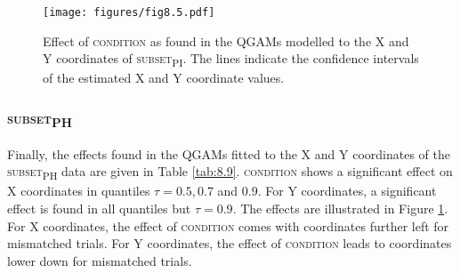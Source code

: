 \begin{figure}[p]
    \centering
    \texttt{[image: figures/fig8.5.pdf]}
    \caption{Effect of \textsc{condition} as found in the QGAMs modelled to the X and Y coordinates of \textsc{subset\textsubscript{PI}}. The lines indicate the confidence intervals of the estimated X and Y coordinate values.}
    \label{fig:8_5}
\end{figure}

\subsubsection{\textsc{subset\textsubscript{PH}}}\label{section08_2_2_4}

Finally, the effects found in the QGAMs fitted to the X and Y coordinates of the \textsc{subset\textsubscript{PH}} data are given in Table \ref{tab:8.9}. \textsc{condition} shows a significant effect on X coordinates in quantiles $\tau=0.5,0.7$ and $0.9$. For Y coordinates, a significant effect is found in all quantiles but $\tau=0.9$. The effects are illustrated in Figure \ref{fig:8_5}. For X coordinates, the effect of \textsc{condition} comes with coordinates further left for mismatched trials. For Y coordinates, the effect of \textsc{condition} leads to coordinates lower down for mismatched trials.

